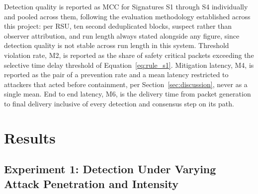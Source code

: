\documentclass[final,5p,twocolumn]{elsarticle}
\theoremstyle{remark}
\theoremstyle{plain}
\begin{document}
Detection quality is reported as MCC for Signatures S1 through S4
individually and pooled across them, following the evaluation methodology
established across this project: per RSU, ten second deduplicated blocks,
suspect rather than observer attribution, and run length always stated
alongside any figure, since detection quality is not stable across run
length in this system. Threshold violation rate, M2, is reported as the
share of safety critical packets exceeding the selective time delay
threshold of Equation~\eqref{eq:rule_s1}. Mitigation latency, M4, is
reported as the pair of a prevention rate and a mean latency restricted to
attackers that acted before containment, per Section~\ref{sec:discussion},
never as a single mean. End to end latency, M6, is the delivery time from
packet generation to final delivery inclusive of every detection and
consensus step on its path.


\section{Results}
\label{sec:results}


\subsection{Experiment 1: Detection Under Varying Attack Penetration and Intensity}
\end{document}
